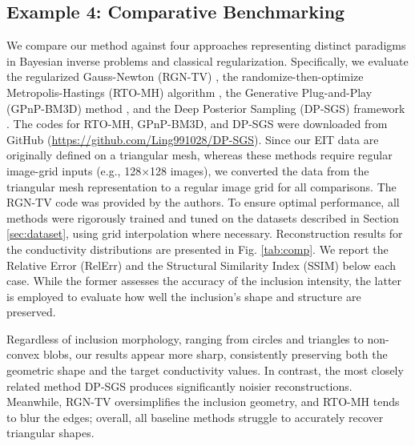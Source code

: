 \documentclass[a4paper,11pt]{article}
\theoremstyle{definition}
\theoremstyle{plain}
\theoremstyle{remark}
\begin{document}
\subsection{Example 4: Comparative Benchmarking}\label{sub:ex4}
We compare our method against four approaches representing distinct paradigms in Bayesian inverse problems and classical regularization. Specifically, we evaluate the regularized Gauss-Newton (RGN-TV) \cite{RGN2022,borsic2009vivo}, the randomize-then-optimize Metropolis-Hastings (RTO-MH) algorithm \cite{bardsley2015randomize}, the Generative Plug-and-Play (GPnP-BM3D) method \cite{bouman2023generative}, and the Deep Posterior Sampling (DP-SGS) framework \cite{ling2025split}.
The codes for RTO-MH, GPnP-BM3D, and DP-SGS were downloaded from GitHub (\url{https://github.com/Ling991028/DP-SGS}).
Since our EIT data are originally defined on a triangular mesh, whereas these methods require regular image-grid inputs (e.g., 128×128 images), we converted the data from the triangular mesh representation to a regular image grid for all comparisons. The RGN-TV code was provided by the authors. To ensure optimal performance, all methods were rigorously trained and tuned on the datasets described in Section \ref{sec:dataset}, using grid interpolation where necessary.
Reconstruction results for the conductivity distributions are presented in Fig. \ref{tab:comp}. We report the Relative Error (RelErr) and the Structural Similarity Index (SSIM) below each case. While the former assesses the accuracy of the inclusion intensity, the latter is employed to evaluate how well the inclusion's shape and structure are preserved.

Regardless of inclusion morphology, ranging from circles and triangles to non-convex blobs, our results appear more sharp, consistently preserving both the geometric shape and the target conductivity values. In contrast, the most closely related method DP-SGS produces significantly noisier reconstructions. Meanwhile, RGN-TV oversimplifies the inclusion geometry, and RTO-MH tends to blur the edges; overall, all baseline methods struggle to accurately recover triangular shapes.
\end{document}
